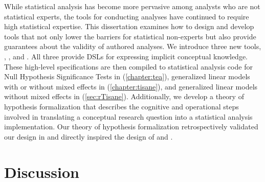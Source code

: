 
While statistical analysis has become more pervasive among analysts who are not
statistical experts, the tools for conducting analyses have continued to require
high statistical expertise. This dissertation examines how to design and develop
tools that not only lower the barriers for statistical non-experts but also
provide guarantees about the validity of authored analyses. We introduce three
new tools, \tea, \tisane, and \rTisane. All three provide DSLs for expressing
implicit conceptual knowledge. These high-level specifications are then compiled
to statistical analysis code for Null Hypothesis Significance Tests in \tea
(\autoref{chapter:tea}), generalized linear models with or without mixed effects
in \tisane (\autoref{chapter:tisane}), and generalized linear models without
mixed effects in \rTisane (\autoref{sec:rTisane}).
Additionally, we develop a theory of hypothesis formalization that describes the
cognitive and operational steps involved in translating a conceptual research
question into a statistical analysis implementation. Our theory of hypothesis
formalization retrospectively validated our design in \tea and directly inspired
the design of \tisane and \rTisane. 


\section{Discussion} \label{sec:discussionChallenges} 


